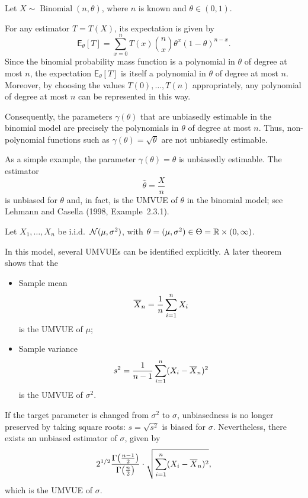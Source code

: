 \begin{ex}
Let \( X \sim \operatorname{Binomial}(n,\theta) \), where \( n \) is known and
\( \theta \in (0,1) \).

For any estimator \( T = T(X) \), its expectation is given by
\[
\mathsf{E}_{\theta}[T]
= \sum_{x=0}^{n} T(x)\binom{n}{x}\theta^{x}(1-\theta)^{n-x}.
\]
Since the binomial probability mass function is a polynomial in \( \theta \) of
degree at most \( n \), the expectation \( \mathsf{E}_{\theta}[T] \) is itself a
polynomial in \( \theta \) of degree at most \( n \).
Moreover, by choosing the values \( T(0),\dots,T(n) \) appropriately, any
polynomial of degree at most \( n \) can be represented in this way.

Consequently, the parameters \( \gamma(\theta) \) that are unbiasedly estimable
in the binomial model are precisely the polynomials in \( \theta \) of degree
at most \( n \).
Thus, non-polynomial functions such as
\( \gamma(\theta) = \sqrt{\theta} \) are not unbiasedly estimable.

As a simple example, the parameter \( \gamma(\theta) = \theta \) is unbiasedly
estimable. The estimator
\[
\widehat{\theta} = \frac{X}{n}
\]
is unbiased for \( \theta \) and, in fact, is the UMVUE of \( \theta \) in the
binomial model; see Lehmann and Casella (1998, Example~2.3.1).
\end{ex}

\begin{ex}
Let \(X_1,\dots,X_n\) be i.i.d.\ \(\mathcal{N}(\mu,\sigma^2)\), with
\(\theta=(\mu,\sigma^2)\in\Theta=\mathbb{R}\times(0,\infty)\).

In this model, several UMVUEs can be identified explicitly.
A later theorem shows that the
\begin{itemize}
    \item Sample mean
    \[
        \overline X_n = \frac{1}{n}\sum\limits_{i=1}^{n} X_i
    \]
    is the UMVUE of \(\mu\);
    \item Sample variance
    \[
        s^2 = \frac{1}{n-1}\sum\limits_{i=1}^{n}(X_i-\overline X_n)^2
    \]
    is the UMVUE of \(\sigma^2\).
\end{itemize}

If the target parameter is changed from \(\sigma^2\) to \(\sigma\), unbiasedness is no longer preserved
by taking square roots: \(s=\sqrt{s^2}\) is biased for \(\sigma\).
Nevertheless, there exists an unbiased estimator of \(\sigma\), given by
\[
    2^{1/2}\frac{\Gamma\!\left(\frac{n-1}{2}\right)}{\Gamma\!\left(\frac{n}{2}\right)}
    \cdot
    \sqrt{\sum\limits_{i=1}^{n}(X_i-\overline X_n)^2},
\]
which is the UMVUE of \(\sigma\).
\end{ex}

